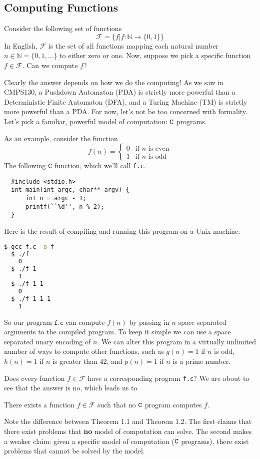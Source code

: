 \documentclass[english, 12pt]{article}
\begin{document}
  \subsection{Computing Functions}
  Consider the following set of functions
  \[ \mathcal{F} = \{ f | f : \mathbb{N} \rightarrow \{0,1\} \} \]
  In English, $\mathcal{F}$ is the set of all functions mapping each natural
  number \(n \in \mathbb{N} = \{0, 1, \dots \} \) to either zero or one.
  Now, suppose we pick a specific function $f \in \mathcal{F}$. Can we
  compute $f$? \n

  Clearly the answer depends on how we do the computing! As we saw in
  CMPS130, a Pushdown Automaton (PDA) is strictly more powerful than a
  Deterministic Finite Automaton (DFA), and a Turing Machine (TM) is
  strictly more powerful than a PDA. For now, let's not be too concerned
  with formality. Let's pick a familiar, powerful model of computation:
  ${\texttt{C}}$ programs. \n

  As an example, consider the function 
  \[f(n) = \begin{cases} 0 & \text{if $n$ is even} \\
                         1 & \text{if $n$ is odd} \end{cases}\]
  The following ${\texttt{C}}$ function, which we'll call \texttt{f.c}.
  \begin{lstlisting}
  #include <stdio.h>
  int main(int argc, char** argv) {
      int n = argc - 1;
      printf(``%d'', n % 2);
  }
  \end{lstlisting}
  Here is the result of compiling and running this program on a Unix machine:
  \begin{lstlisting}[language=bash]
  $ gcc f.c -o f
  $ ./f
    0
  $ ./f 1
    1
  $ ./f 1 1
    0
  $ ./f 1 1 1
    1
  \end{lstlisting}
  So our program $\texttt{f.c}$ can compute $f(n)$ by passing in 
  $n$ space separated arguments to the compiled program. To keep it simple we
  can use a space separated unary encoding of $n$. We can alter this program
  in a virtually unlimited number of ways to compute other functions, such
  as $g(n) = 1$ if $n$ is odd, $h(n) = 1$ if $n$ is greater than $42$, and 
  $p(n) = 1$ if $n$ is a prime number.\n

  Does every function $f \in \mathcal{F}$ have a corresponding program 
  \texttt{f.c}? We are about to see that the answer is no, which leads us
  to
  \begin{thrm} There exists a function $f \in \mathcal{F}$ such that no
               ${\texttt{C}}$ program computes $f$.
  \end{thrm}
  Note the difference between Theorem 1.1 and Theorem 1.2. The first claims
  that there exist problems that {\bf no} model of computation can solve. The
  second makes a weaker claim: given a specific model of computation (${\texttt{C}}$ 
  programs), there exist problems that cannot be solved by the model.
\end{document}
